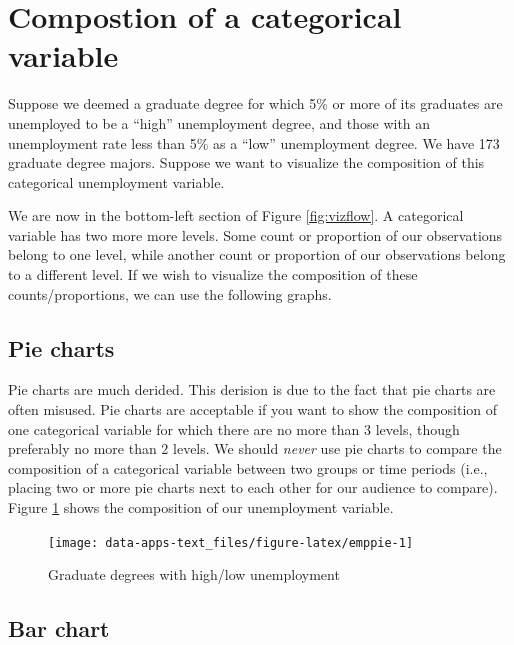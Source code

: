 \documentclass[
]{book}
\begin{document}
\hypertarget{compostion-of-a-categorical-variable}{%
\section{Compostion of a categorical variable}\label{compostion-of-a-categorical-variable}}

Suppose we deemed a graduate degree for which 5\% or more of its graduates are unemployed to be a ``high'' unemployment degree, and those with an unemployment rate less than 5\% as a ``low'' unemployment degree. We have 173 graduate degree majors. Suppose we want to visualize the composition of this categorical unemployment variable.

We are now in the bottom-left section of Figure \ref{fig:vizflow}. A categorical variable has two more more levels. Some count or proportion of our observations belong to one level, while another count or proportion of our observations belong to a different level. If we wish to visualize the composition of these counts/proportions, we can use the following graphs.

\hypertarget{pie-charts}{%
\subsection{Pie charts}\label{pie-charts}}

Pie charts are much derided. This derision is due to the fact that pie charts are often misused. Pie charts are acceptable if you want to show the composition of one categorical variable for which there are no more than 3 levels, though preferably no more than 2 levels. We should \emph{never} use pie charts to compare the composition of a categorical variable between two groups or time periods (i.e., placing two or more pie charts next to each other for our audience to compare). Figure \ref{fig:emppie} shows the composition of our unemployment variable.

\begin{figure}

{\centering \texttt{[image: data-apps-text\_files/figure-latex/emppie-1]} 

}

\caption{Graduate degrees with high/low unemployment}\label{fig:emppie}
\end{figure}

\hypertarget{bar-chart}{%
\subsection{Bar chart}\label{bar-chart}}
\end{document}
